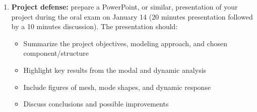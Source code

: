 \documentclass[12pt]{article}
\begin{document}
\begin{enumerate}
\begin{enumerate}[label=\alph*.]
          \item Critically analyze the results, including potential sources of error, sensitivity to mesh refinement, and limitations of the model or numerical methods. Summarize the main findings of the modal and dynamic analysis and propose possible extensions or improvements for future studies.
        \end{enumerate}

  \item \textbf{Project defense:} prepare a PowerPoint, or similar, presentation of your project during the oral exam on January 14 (20 minutes presentation followed by a 10 minutes discussion). The presentation should:
        \begin{itemize}
          \item Summarize the project objectives, modeling approach, and chosen component/structure
          \item Highlight key results from the modal and dynamic analysis
          \item Include figures of mesh, mode shapes, and dynamic response
          \item Discuss conclusions and possible improvements
        \end{itemize}
\end{enumerate}
\end{document}
